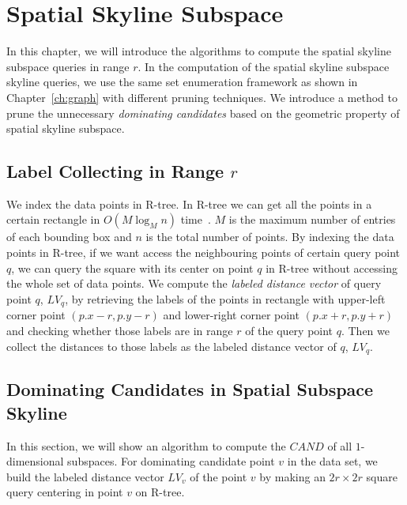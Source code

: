 
%
%

\chapter{Spatial Skyline Subspace}
\label{ch:spatial}

In this chapter, we will introduce the algorithms to compute the spatial skyline subspace queries in range $r$. In the computation of the spatial skyline subspace skyline queries, we use the same set enumeration framework as shown in Chapter~\ref{ch:graph} with different pruning techniques. We introduce a method to prune the unnecessary \emph{dominating candidates} based on the geometric property of spatial skyline subspace.

\section{Label Collecting in Range $r$}
We index the data points in R-tree. In R-tree we can get all the points in a certain rectangle in $O(M \log_M n)$ time~\cite{guttman1984r}. $M$ is the maximum number of entries of each bounding box and $n$ is the total number of points. By indexing the data points in R-tree, if we want access the neighbouring points of certain query point $q$, we can query the square with its center on point $q$ in R-tree without accessing the whole set of data points. We compute the \emph{labeled distance vector} of query point $q$, $LV_q$, by retrieving the labels of the points in rectangle with upper-left corner point $(p.x - r, p.y - r)$ and lower-right corner point $(p.x + r, p.y + r)$ and checking whether those labels are in range $r$ of the query point $q$. Then we collect the distances to those labels as the labeled distance vector of $q$, $LV_q$.

\section{Dominating Candidates in Spatial Subspace Skyline}

In this section, we will show an algorithm to compute the $\mathit{CAND}$ of all $1$-dimensional subspaces. For dominating candidate point $v$ in the data set, we build the labeled distance vector $LV_v$ of the point $v$ by making an $2r \times 2r$ square query centering in point $v$ on R-tree.

